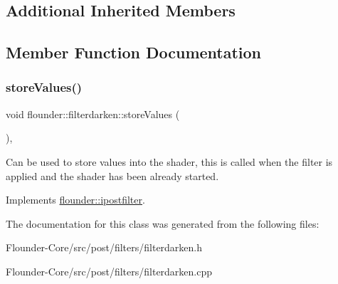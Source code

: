 \subsection*{Additional Inherited Members}


\subsection{Member Function Documentation}
\mbox{\label{classflounder_1_1filterdarken_a5cee7990cb4de781465cf43f4695e823}} 
\subsubsection{\texorpdfstring{store\+Values()}{storeValues()}}
{\footnotesize\ttfamily void flounder\+::filterdarken\+::store\+Values (\begin{DoxyParamCaption}{ }\end{DoxyParamCaption})\hspace{0.3cm}{\ttfamily [override]}, {\ttfamily [virtual]}}



Can be used to store values into the shader, this is called when the filter is applied and the shader has been already started. 



Implements \hyperlink{classflounder_1_1ipostfilter_a9b658b4672718d5ac36539875bde722e}{flounder\+::ipostfilter}.



The documentation for this class was generated from the following files\+:\begin{DoxyCompactItemize}
\item 
Flounder-\/\+Core/src/post/filters/filterdarken.\+h\item 
Flounder-\/\+Core/src/post/filters/filterdarken.\+cpp\end{DoxyCompactItemize}
